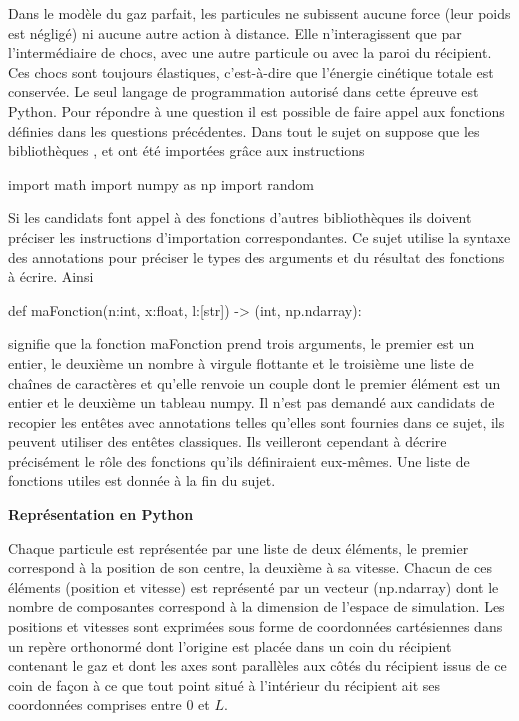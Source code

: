 \documentclass[twoside,french,11pt]{VcCours}
\begin{document}
Dans le modèle du gaz parfait, les particules ne subissent aucune force (leur poids est négligé) ni aucune autre
action à distance. Elle n'interagissent que par l'intermédiaire de chocs, avec une autre particule ou avec la paroi
du récipient. Ces chocs sont toujours élastiques, c'est-à-dire que l'énergie cinétique totale est conservée.
Le seul langage de programmation autorisé dans cette épreuve est Python. Pour répondre à une
question il est possible de faire appel aux fonctions définies dans les questions précédentes. Dans tout le sujet
on suppose que les bibliothèques ,  et  ont été importées grâce aux instructions
\begin{Python*}  
import math
import numpy as np
import random
\end{Python*}  
Si les candidats font appel à des fonctions d'autres bibliothèques ils doivent préciser 
les instructions d'importation correspondantes.
Ce sujet utilise la syntaxe des annotations pour préciser le types des arguments et du résultat des fonctions à
écrire. Ainsi
\begin{Python*}
def maFonction(n:int, x:float, l:[str]) -> (int, np.ndarray):
\end{Python*} 
signifie que la fonction maFonction prend trois arguments, le premier est un entier, le deuxième un nombre à
virgule flottante et le troisième une liste de chaînes de caractères et qu'elle renvoie un couple dont le premier
élément est un entier et le deuxième un tableau numpy. Il n'est pas demandé aux candidats de recopier les
entêtes avec annotations telles qu'elles sont fournies dans ce sujet, ils peuvent utiliser des entêtes classiques. Ils
veilleront cependant à décrire précisément le rôle des fonctions qu'ils définiraient eux-mêmes.
Une liste de fonctions utiles est donnée à la fin du sujet.

\medskip
\textbf{Représentation en Python}

\smallskip
Chaque particule est représentée par une liste de deux éléments, le premier correspond à la position de son
centre, la deuxième à sa vitesse. Chacun de ces éléments (position et vitesse) est représenté par un vecteur
(np.ndarray) dont le nombre de composantes correspond à la dimension de l'espace de simulation.
Les positions et vitesses sont exprimées sous forme de coordonnées cartésiennes dans un repère orthonormé
dont l'origine est placée dans un coin du récipient contenant le gaz et dont les axes sont parallèles aux côtés
du récipient issus de ce coin de façon à ce que tout point situé à l'intérieur du récipient ait ses coordonnées
comprises entre $0$ et $L$.
\end{document}
